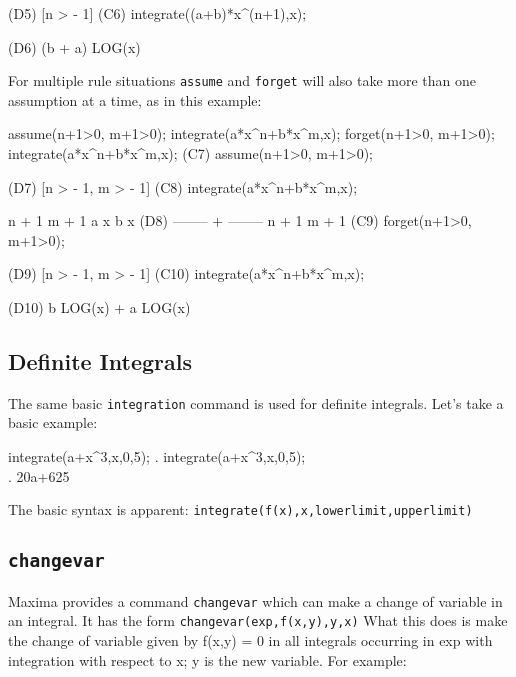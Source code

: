 (D5)                               [n > - 1]
(C6) integrate((a+b)*x^(n+1),x);

(D6)                            (b + a) LOG(x)
\endmaximasession

For multiple rule situations {\tt assume} and {\tt forget} will also 
take more than one assumption at a time, as in this example:

\beginmaximasession
assume(n+1>0, m+1>0);
integrate(a*x^n+b*x^m,x);
forget(n+1>0, m+1>0);
integrate(a*x^n+b*x^m,x);
\maximasession
(C7) assume(n+1>0, m+1>0);


(D7)                          [n > - 1, m > - 1]
(C8) integrate(a*x^n+b*x^m,x);


                                 n + 1      m + 1
                              a x        b x
(D8)                          -------- + --------
                               n + 1      m + 1
(C9) forget(n+1>0, m+1>0);


(D9)                          [n > - 1, m > - 1]
(C10) integrate(a*x^n+b*x^m,x);

(D10)                         b LOG(x) + a LOG(x)
\endmaximasession

\subsection{Definite Integrals}

The same basic {\tt integration} command is used for definite integrals.
Let's take a basic example:

\beginmaximasession
integrate(a+x^3,x,0,5);
\maximatexsession
{}.  integrate(a+x^3,x,0,5); \\
.   {{20\*a+625}} \\
\endmaximasession

The basic syntax is apparent: {\tt integrate(f(x),x,lowerlimit,upperlimit)}

\subsection{{\tt changevar}}

Maxima provides a command {\tt changevar} which can make a change of
variable in an integral. It has the form {\tt changevar(exp,f(x,y),y,x)}
What this does is make the change of variable given by f(x,y) = 0 in all 
integrals occurring in exp with integration with respect to x; y is the 
new variable. For example:

